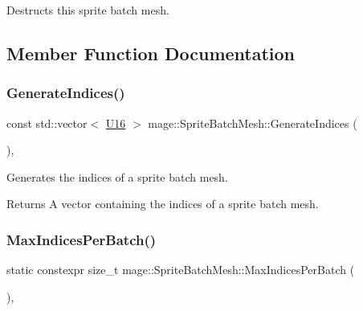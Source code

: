 Destructs this sprite batch mesh. 

\subsection{Member Function Documentation}
\hypertarget{classmage_1_1_sprite_batch_mesh_ac86d489223a98f63d9d4aa9a296fb051}{}\label{classmage_1_1_sprite_batch_mesh_ac86d489223a98f63d9d4aa9a296fb051} 
\subsubsection{\texorpdfstring{Generate\+Indices()}{GenerateIndices()}}
{\footnotesize\ttfamily const std\+::vector$<$ \hyperlink{namespacemage_af69057eec1ce005c1c3b34ae33486f16}{U16} $>$ mage\+::\+Sprite\+Batch\+Mesh\+::\+Generate\+Indices (\begin{DoxyParamCaption}{ }\end{DoxyParamCaption})\hspace{0.3cm}{\ttfamily [static]}, {\ttfamily [private]}}

Generates the indices of a sprite batch mesh.

\begin{DoxyReturn}{Returns}
A vector containing the indices of a sprite batch mesh. 
\end{DoxyReturn}
\hypertarget{classmage_1_1_sprite_batch_mesh_a3c4aa8a1c0d5055e3e9b2290b2957bba}{}\label{classmage_1_1_sprite_batch_mesh_a3c4aa8a1c0d5055e3e9b2290b2957bba} 
\subsubsection{\texorpdfstring{Max\+Indices\+Per\+Batch()}{MaxIndicesPerBatch()}}
{\footnotesize\ttfamily static constexpr size\+\_\+t mage\+::\+Sprite\+Batch\+Mesh\+::\+Max\+Indices\+Per\+Batch (\begin{DoxyParamCaption}{ }\end{DoxyParamCaption})\hspace{0.3cm}{\ttfamily [static]}, {\ttfamily [noexcept]}}


